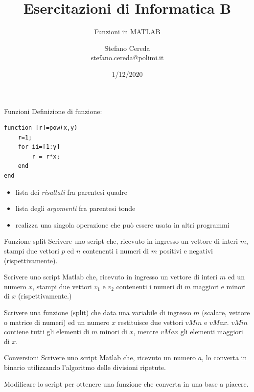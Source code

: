 \documentclass[aspectratio=169, ]{beamer}
\title{Esercitazioni di Informatica B}
\subtitle{Funzioni in MATLAB}
\author{Stefano Cereda\\
	stefano.cereda@polimi.it
}
\date{1/12/2020}
\institute[PoliMi]{Politecnico Milano}
\begin{document}
\begin{frame}
    \maketitle
\end{frame}

\begin{frame}[fragile]{Funzioni}
    Definizione di funzione:
    \begin{lstlisting}[style=matlab]
function [r]=pow(x,y)
    r=1;
    for ii=[1:y]
        r = r*x;
    end
end
    \end{lstlisting}
    \begin{itemize}
        \item lista dei \emph{risultati} fra parentesi quadre
        \item lista degli \emph{argomenti} fra parentesi tonde
        \item realizza una singola operazione che può essere usata in altri programmi
    \end{itemize}
\end{frame}

\begin{frame}{Funzione split}
    Scrivere uno script che, ricevuto in ingresso un vettore di interi $m$, stampi due vettori $p$ ed $n$ contenenti i
    numeri di $m$ positivi e negativi (rispettivamente).

    \pause
    Scrivere uno script Matlab che, ricevuto in ingresso un vettore di interi $m$ ed un numero $x$, stampi due vettori $v_1$ e $v_2$ contenenti i numeri di $m$ maggiori e minori di $x$ (rispettivamente.)

    \pause
    Scrivere una funzione (split) che data una variabile di ingresso $m$ (scalare, vettore o
    matrice di numeri) ed un numero $x$ restituisce due vettori $vMin$ e $vMax$. $vMin$
    contiene tutti gli elementi di $m$ minori di $x$, mentre $vMax$ gli elementi maggiori
    di $x$.
\end{frame}

\begin{frame}{Conversioni}
    Scrivere uno script Matlab che, ricevuto un numero $a$, lo converta in binario utilizzando l'algoritmo delle divisioni ripetute.

    Modificare lo script per ottenere una funzione che converta in una base a piacere.
\end{frame}
\end{document}
